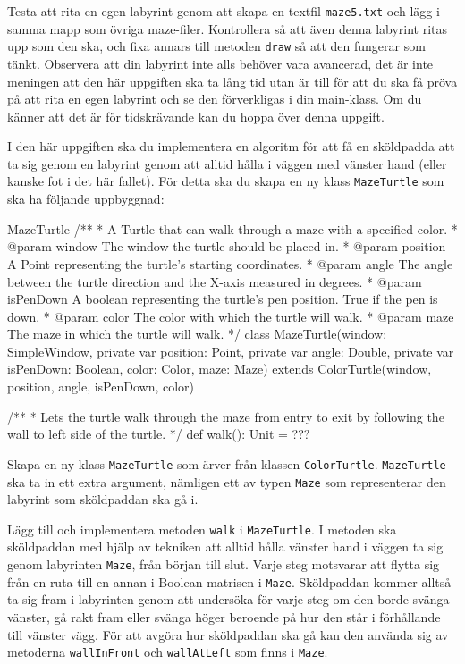 \Subtask Testa att rita en egen labyrint genom att skapa en textfil \texttt{maze5.txt} och lägg i samma mapp som övriga maze-filer. Kontrollera så att även denna labyrint ritas upp som den ska, och fixa annars till metoden \texttt{draw} så att den fungerar som tänkt. Observera att din labyrint inte alls behöver vara avancerad, det är inte meningen att den här uppgiften ska ta lång tid utan är till för att du ska få pröva på att rita en egen labyrint och se den förverkligas i din main-klass. Om du känner att det är för tidskrävande kan du hoppa över denna uppgift.


\Task I den här uppgiften ska du implementera en algoritm för att få en sköldpadda att ta sig genom en labyrint genom att alltid hålla i väggen med vänster hand (eller kanske fot i det här fallet). För detta ska du skapa en ny klass \texttt{MazeTurtle} som ska ha följande uppbyggnad:


\begin{ScalaSpec}{MazeTurtle}
/**
 * A Turtle that can walk through a maze with a specified color.
 * @param window     The window the turtle should be placed in.
 * @param position   A Point representing the turtle's starting coordinates.
 * @param angle      The angle between the turtle direction and the X-axis 
 measured in degrees.
 * @param isPenDown  A boolean representing the turtle's pen position. 
 True if the pen is down.
 * @param color		   The color with which the turtle will walk.
 * @param maze	     The maze in which the turtle will walk.
 */
class MazeTurtle(window: SimpleWindow, private var position: Point, 
private var angle: Double, private var isPenDown: Boolean, 
color: Color, maze: Maze) extends ColorTurtle(window, position, angle, 
isPenDown, color) {

  /**
   * Lets the turtle walk through the maze from entry to exit by 
   following the wall to left side of the turtle.
   */
  def walk(): Unit = ???
}

\end{ScalaSpec}

\Subtask Skapa en ny klass \texttt{MazeTurtle} som ärver från klassen \texttt{ColorTurtle}. \texttt{MazeTurtle} ska ta in ett extra argument, nämligen ett av typen \texttt{Maze} som representerar den labyrint som sköldpaddan ska gå i.

\Subtask Lägg till och implementera metoden \texttt{walk} i \texttt{MazeTurtle}. I metoden ska sköldpaddan med hjälp av tekniken att alltid hålla vänster hand i väggen ta sig genom labyrinten \texttt{Maze}, från början till slut. Varje steg motsvarar att flytta sig från en ruta till en annan i Boolean-matrisen i \texttt{Maze}. Sköldpaddan kommer alltså ta sig fram i labyrinten genom att undersöka för varje steg om den borde svänga vänster, gå rakt fram eller svänga höger beroende på hur den står i förhållande till vänster vägg. För att avgöra hur sköldpaddan ska gå kan den använda sig av metoderna \texttt{wallInFront} och \texttt{wallAtLeft} som finns i \texttt{Maze}.


